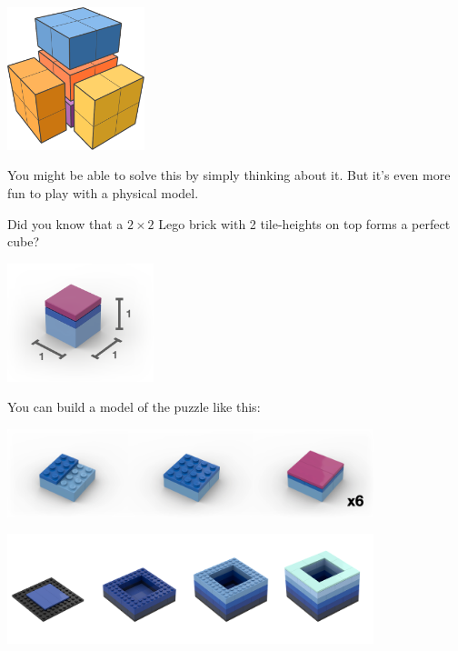 \documentclass[
]{article}
\begin{document}
\begin{center}\includegraphics[width=0.3\textwidth]{img/img3.pdf}\end{center}

You might be able to solve this by simply thinking about it. But it's
even more fun to play with a physical model.

Did you know that a \(2\times 2\) Lego brick with 2 tile-heights on top
forms a perfect cube?

\begin{center}\includegraphics[width=0.32\textwidth]{img/annotated_lego_cube.png}\end{center}

You can build a model of the puzzle like this:

\begin{center}\includegraphics[width=0.8\textwidth]{img/piece_steps2.png}\end{center}
\begin{center}\includegraphics[width=0.8\textwidth]{img/puzzle_box_steps.png}\end{center}
\end{document}
